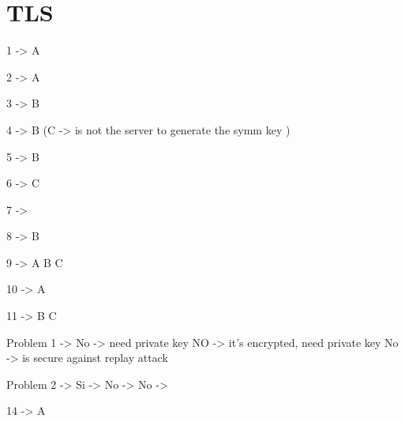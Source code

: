 \section*{TLS}
1 -> A

2 -> A 

3 -> B 

4 -> B  (C -> is not the server to  generate the symm key )

5 -> B

6 -> C

7 -> 

8 -> B

9 -> A B C

10 -> A

11 -> B C

Problem 1 ->  {
    No -> need private key
    NO -> it's encrypted, need private key
    No -> is secure against replay attack
}

Problem 2 -> {
    Si -> 
    No -> 
    No -> 
}

14 -> A 